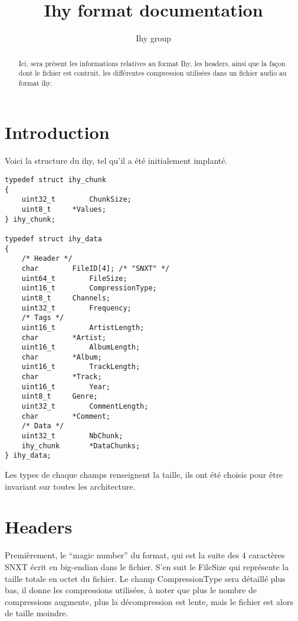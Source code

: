 \documentclass[a4paper,12pt]{article}
\title{Ihy format documentation}
\author{Ihy group}
\begin{document}
\maketitle

\begin{abstract}
Ici, sera présent les informations relatives au format Ihy, les headers, ainsi
que la façon dont le fichier est contruit, les différentes compression
utilisées dans un fichier audio au format ihy.
\end{abstract}

\tableofcontents

\section{Introduction}

Voici la structure du ihy, tel qu'il a été initialement implanté.

\lstset{numbers=left}
\begin{lstlisting}[frame=single]
typedef struct ihy_chunk
{
    uint32_t		ChunkSize;
    uint8_t		*Values;
} ihy_chunk;

typedef struct ihy_data
{
    /* Header */
    char		FileID[4]; /* "SNXT" */
    uint64_t		FileSize;
    uint16_t		CompressionType;
    uint8_t		Channels;
    uint32_t		Frequency;
    /* Tags */
    uint16_t		ArtistLength;
    char		*Artist;
    uint16_t		AlbumLength;
    char		*Album;
    uint16_t		TrackLength;
    char		*Track;
    uint16_t		Year;
    uint8_t		Genre;
    uint32_t		CommentLength;
    char		*Comment;
    /* Data */
    uint32_t		NbChunk;
    ihy_chunk		*DataChunks;
} ihy_data;
\end{lstlisting}

Les types de chaque champs renseignent la taille, ils ont été choisis pour être
invariant sur toutes les architecture.

\section{Headers}

Premièrement, le ``magic number'' du format, qui est la suite des 4 caractères
SNXT écrit en big-endian dans le fichier.
S'en suit le FileSize qui représente la taille totale en octet du fichier.
Le champ CompressionType sera détaillé plus bas, il donne les compressions
utilisées, à noter que plus le nombre de compressions augmente, plus la
décompression est lente, mais le fichier est alors de taille moindre.
\end{document}

